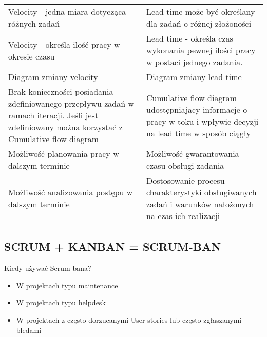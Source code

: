 \documentclass[../main.tex]{subfiles}
\begin{document}
\begin{table}[H]
\begin{center}
\begin{tabular}{ | p{8cm} p{8cm} |}
                \cmidrule(r){1-1}\cmidrule(l){2-2}
                Velocity - jedna miara dotycząca różnych zadań
                &
                Lead time może być określany dla zadań o różnej złożoności\\

                \cmidrule(r){1-1}\cmidrule(l){2-2}
                Velocity - określa ilość pracy w okresie czasu
                &
                Lead time - określa czas wykonania pewnej ilości pracy w postaci jednego zadania.\\

                \cmidrule(r){1-1}\cmidrule(l){2-2}
                Diagram zmiany velocity & Diagram zmiany lead time\\

                \cmidrule(r){1-1}\cmidrule(l){2-2}
                Brak konieczności posiadania zdefiniowanego przepływu zadań w ramach iteracji. Jeśli jest zdefiniowany
                można korzystać z Cumulative flow diagram
                &
                Cumulative flow diagram udostępniający informacje o pracy w toku i wpływie decyzji na lead time w sposób ciągły\\

                \cmidrule(r){1-1}\cmidrule(l){2-2}
                Możliwość planowania pracy w dalszym terminie
                &
                Możliwość gwarantowania czasu obsługi zadania\\

                \cmidrule(r){1-1}\cmidrule(l){2-2}
                Możliwość analizowania postępu w dalszym terminie
                &
                Dostosowanie procesu charakterystyki obsługiwanych zadań i warunków nałożonych na czas ich realizacji\\

                \bottomrule
            \end{tabular}
        \end{center}
    \end{table}





    \subsection{SCRUM + KANBAN = SCRUM-BAN}
    Kiedy używać Scrum-bana?
    \begin{itemize}
        \item W projektach typu maintenance
        \item W projektach typu helpdesk
        \item W projektach z często dorzucanymi User stories
        lub często zgłaszanymi bledami
    \end{itemize}
\end{document}
